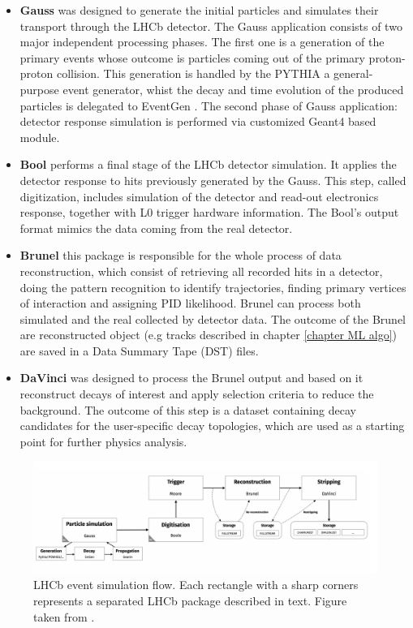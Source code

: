 \begin{itemize}
    \item \textbf{Gauss} \cite{gauss} was designed to generate the initial particles and simulates their transport through the LHCb detector. The Gauss application consists of two major independent processing phases. The first one is a generation of the primary events whose outcome is particles coming out of the primary proton-proton collision. This generation is handled by the PYTHIA \cite{pythia} a general-purpose event generator, whist the decay and time evolution of the produced particles is delegated to EventGen \cite{eventGen}. The second phase of Gauss application: detector response simulation is performed via customized Geant4 \cite{geant4} based module. 
    \item \textbf{Bool} performs a final stage of the LHCb detector simulation. It applies the detector response to hits previously generated by the Gauss. This step, called digitization, includes simulation of the detector and read-out electronics response, together with  L0 trigger hardware information. The Bool’s output format mimics the data coming from the real detector.
    \item \textbf{Brunel} this package is responsible for the whole process of data reconstruction, which consist of retrieving all recorded hits in a detector, doing the pattern recognition to identify trajectories, finding primary vertices of interaction and assigning PID likelihood. Brunel can process both simulated and the real collected by detector data. The outcome of the Brunel are reconstructed object (e.g tracks described in chapter \ref{chapter ML algo}) are saved in a Data Summary Tape (DST) files.   
    \item  \textbf{DaVinci} was designed to process the Brunel output and based on it reconstruct decays of interest and apply selection criteria to reduce the background. The outcome of this step is a dataset containing decay candidates for the user-specific decay topologies, which are used as a starting point for further physics analysis.   
    
\end{itemize}


\begin{figure}[!h]
\centering
\includegraphics[width=\linewidth]{figures/LHCb_simulation.PNG}
\caption{LHCb event simulation flow. Each rectangle with a sharp corners represents a separated LHCb package described in text. Figure taken from  \cite{lhcb_computing}.
\label{fig:lhcb_sim}}
\end{figure}



